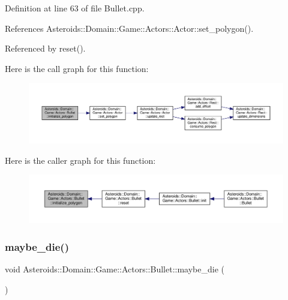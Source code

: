 Definition at line 63 of file Bullet.\+cpp.



References Asteroids\+::\+Domain\+::\+Game\+::\+Actors\+::\+Actor\+::set\+\_\+polygon().



Referenced by reset().

Here is the call graph for this function\+:\nopagebreak
\begin{figure}[H]
\begin{center}
\leavevmode
\includegraphics[width=350pt]{classAsteroids_1_1Domain_1_1Game_1_1Actors_1_1Bullet_ae02bb0b6f3886f31ffdf1e51b1735035_cgraph}
\end{center}
\end{figure}
Here is the caller graph for this function\+:\nopagebreak
\begin{figure}[H]
\begin{center}
\leavevmode
\includegraphics[width=350pt]{classAsteroids_1_1Domain_1_1Game_1_1Actors_1_1Bullet_ae02bb0b6f3886f31ffdf1e51b1735035_icgraph}
\end{center}
\end{figure}
\mbox{\label{classAsteroids_1_1Domain_1_1Game_1_1Actors_1_1Bullet_aa5772b07856c5191c8ccdf5d0df568e8}} 
\subsubsection{\texorpdfstring{maybe\+\_\+die()}{maybe\_die()}}
{\footnotesize\ttfamily void Asteroids\+::\+Domain\+::\+Game\+::\+Actors\+::\+Bullet\+::maybe\+\_\+die (\begin{DoxyParamCaption}{ }\end{DoxyParamCaption})\hspace{0.3cm}{\ttfamily [private]}}



